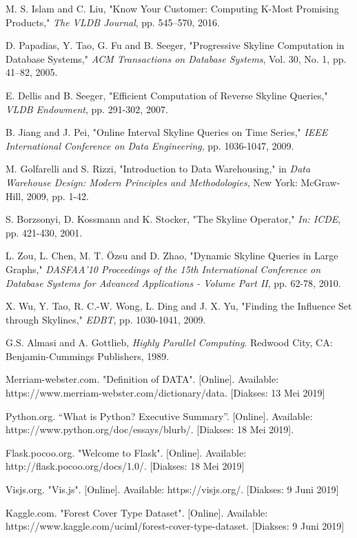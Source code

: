 \begin{thebibliography}{9}
	M. S. Islam and C. Liu, "Know Your Customer: Computing K-Most Promising Products," \textit{The VLDB Journal}, pp. 545–570, 2016.
	
	D. Papadias, Y. Tao, G. Fu and B. Seeger, "Progressive Skyline Computation in Database Systems," \textit{ACM Transactions on Database Systems}, Vol. 30, No. 1, pp. 41–82, 2005.
	
	E. Dellis and B. Seeger, "Efficient Computation of Reverse Skyline Queries," \textit{VLDB Endowment}, pp. 291-302, 2007.
	
	B. Jiang and J. Pei, "Online Interval Skyline Queries on Time Series," \textit{IEEE International Conference on Data Engineering}, pp. 1036-1047, 2009.
	
	M. Golfarelli and S. Rizzi, "Introduction to Data Warehousing," in \textit{Data Warehouse Design: Modern Principles and Methodologies}, New York: McGraw-Hill, 2009, pp. 1-42. 
	
	S. Borzsonyi, D. Kossmann and K. Stocker, "The Skyline Operator," \textit{In: ICDE}, pp. 421-430, 2001.
	
	L. Zou, L. Chen, M. T. Özsu and D. Zhao, "Dynamic Skyline Queries in Large Graphs," \textit{DASFAA'10 Proceedings of the 15th International Conference on Database Systems for Advanced Applications - Volume Part II}, pp. 62-78, 2010.
	
	X. Wu, Y. Tao, R. C.-W. Wong, L. Ding and J. X. Yu, "Finding the Influence Set through Skylines," \textit{EDBT}, pp. 1030-1041, 2009.
	
	G.S. Almasi and A. Gottlieb, \textit{Highly Parallel Computing}. Redwood City, CA: Benjamin-Cummings Publishers, 1989.
	
	Merriam-webster.com. "Definition of DATA". [Online]. Available: https://www.merriam-webster.com/dictionary/data. [Diakses: 13 Mei 2019]
	
	Python.org. “What is Python? Executive Summary”. [Online]. Available: https://www.python.org/doc/essays/blurb/. [Diakses: 18 Mei 2019].
	
	Flask.pocoo.org. "Welcome to Flask". [Online]. Available: http://flask.pocoo.org/docs/1.0/. [Diakses: 18 Mei 2019]
	
	Visjs.org. "Vis.js". [Online]. Available: https://visjs.org/. [Diakses: 9 Juni 2019]
	
	Kaggle.com. "Forest Cover Type Dataset". [Online]. Available: https://www.kaggle.com/uciml/forest-cover-type-dataset. [Diakses: 9 Juni 2019]
		
\end{thebibliography}
